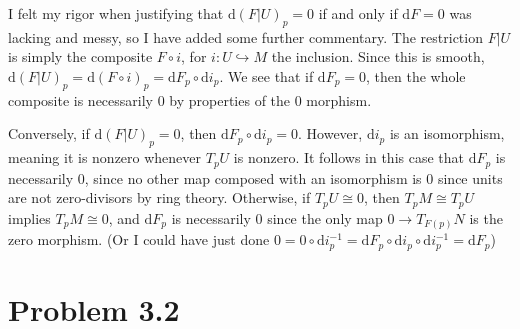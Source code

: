 \documentclass[11pt, letterpaper]{article}
\theoremstyle{plain}
\begin{document}
\begin{remark}
	I felt my rigor when justifying that $\mathrm{d} (F|U)_p=0$ if and only if $\mathrm{d} F=0$ was lacking and messy, so I have added some further commentary. The restriction $F|U$ is simply the composite $F\circ i$, for $i : U\hookrightarrow M$ the inclusion. Since this is smooth, $\mathrm{d} (F|U)_p=\mathrm{d} (F\circ i)_p=\mathrm{d} F_p\circ \mathrm{d} i_p$. We see that if $\mathrm{d} F_p=0$, then the whole composite is necessarily 0 by properties of the 0 morphism.

	Conversely, if $\mathrm{d} (F|U)_p=0$, then $\mathrm{d} F_p\circ \mathrm{d} i_p=0$. However, $\mathrm{d} i_p$ is an isomorphism, meaning it is nonzero whenever $T_pU$ is nonzero. It follows in this case that $\mathrm{d} F_p$ is necessarily 0, since no other map composed with an isomorphism is 0 since units are not zero-divisors by ring theory. Otherwise, if $T_pU\cong 0$, then $T_pM\cong T_pU$ implies $T_pM\cong 0$, and $\mathrm{d} F_p$ is necessarily 0 since the only map $0\to T_{F(p)} N$ is the zero morphism. (Or I could have just done $0=0 \circ \mathrm{d} i^{-1}_p =\mathrm{d} F_p\circ \mathrm{d} i_p\circ \mathrm{d} i_p ^{-1} =\mathrm{d} F_p$)
\end{remark}


\section{Problem 3.2}
\end{document}
